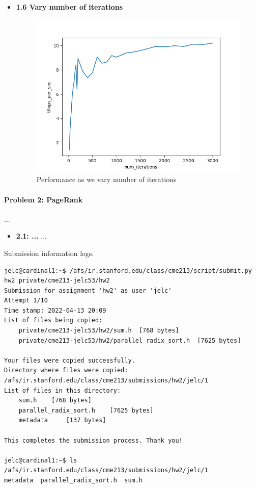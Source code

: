 \documentclass[12pt,letterpaper,twoside]{article}
\begin{document}
\begin{itemize}
    \item \textbf{1.6 Vary number of iterations}

    \begin{figure}[h]
        \center
        \includegraphics[scale=0.7]{q1_6.png}
        \caption{Performance as we vary number of iterations}
    \end{figure}
    
\end{itemize}


\paragraph{Problem 2: PageRank} ...

\begin{itemize}
    \item \textbf{2.1: ...} ...


\end{itemize}


Submission information logs.
\begin{verbatim}
jelc@cardinal1:~$ /afs/ir.stanford.edu/class/cme213/script/submit.py hw2 private/cme213-jelc53/hw2
Submission for assignment 'hw2' as user 'jelc'
Attempt 1/10
Time stamp: 2022-04-13 20:09
List of files being copied:
    private/cme213-jelc53/hw2/sum.h	 [768 bytes]
    private/cme213-jelc53/hw2/parallel_radix_sort.h	 [7625 bytes]

Your files were copied successfully.
Directory where files were copied: /afs/ir.stanford.edu/class/cme213/submissions/hw2/jelc/1
List of files in this directory:
    sum.h	 [768 bytes]
    parallel_radix_sort.h	 [7625 bytes]
    metadata	 [137 bytes]

This completes the submission process. Thank you!

jelc@cardinal1:~$ ls /afs/ir.stanford.edu/class/cme213/submissions/hw2/jelc/1
metadata  parallel_radix_sort.h  sum.h
\end{verbatim}
\end{document}
